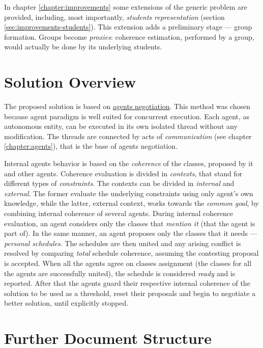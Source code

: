\documentclass[header]{subfiles}
\begin{document}
\noindent
In chapter \ref{chapter:improvements} some extensions of the generic problem
are provided, including, most importantly, \emph{students representation}
(section \ref{sec:improvements-students}). This extension adds a preliminary
stage --- group formation. Groups become \emph{proxies}: coherence estimation,
performed by a group, would actually be done by its underlying students.

\section{Solution Overview}
The proposed solution is based on \underline{agents negotiation}.
This method was chosen because agent paradigm is well suited for concurrent
execution. Each agent, as autonomous entity, can be executed in its own
isolated thread without any modification. The threads are connected by acts of
\emph{communication} (see chapter \ref{chapter:agents}), that is the base of
agents negotiation.

Internal agents behavior is based on the \emph{coherence} of the classes,
proposed by it and other agents. Coherence evaluation is divided in \emph{contexts},
that stand for different types of \emph{constraints}. The contexts can be divided
in \emph{internal} and \emph{external}. The former evaluate the underlying
constraints using only agent's own knowledge, while the latter, external context,
works towards the \emph{common goal}, by combining internal coherence of several
agents.
During internal coherence evaluation, an agent considers only the
classes that \emph{mention it} (that the agent is part of). In the same manner,
an agent proposes only the classes that it needs --- \emph{personal schedules}.
The schedules are then united and any arising conflict is resolved by comparing
\emph{total} schedule coherence, assuming the contesting proposal is accepted.
When all the agents agree on classes assignment (the classes for all the agents
are successfully united), the schedule is considered \emph{ready} and is reported.
After that the agents guard their respective internal coherence of the solution
to be used as a threshold, reset their proposals and begin to negotiate a better
solution, until explicitly stopped.


\section{Further Document Structure}
\end{document}
